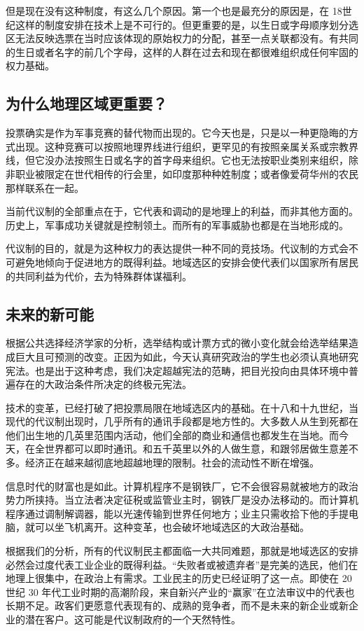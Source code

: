 但是现在没有这种制度，有这么几个原因。第一个也是最充分的原因是，在 18世纪这样的制度安排在技术上是不可行的。但更重要的是，以生日或字母顺序划分选区无法反映选票在当时应该体现的原始权力的分配，甚至一点关联都没有。有共同的生日或者名字的前几个字母，这样的人群在过去和现在都很难组织成任何牢固的权力基础。

\subsection{为什么地理区域更重要？}
投票确实是作为军事竞赛的替代物而出现的。它今天也是，只是以一种更隐晦的方式出现。这种竞赛可以按照地理界线进行组织，更罕见的有按照亲属关系或宗教界线，但它没办法按照生日或名字的首字母来组织。它也无法按职业类别来组织，除非职业被限定在世代相传的行会里，如印度那种种姓制度；或者像爱荷华州的农民那样联系在一起。

当前代议制的全部重点在于，它代表和调动的是地理上的利益，而非其他方面的。历史上，军事成功关键就是控制领土。而所有的军事威胁也都是在当地形成的。

代议制的目的，就是为这种权力的表达提供一种不同的竞技场。代议制的方式会不可避免地倾向于促进地方的既得利益。地域选区的安排会使代表们以国家所有居民的共同利益为代价，去为特殊群体谋福利。

\subsection{未来的新可能}
根据公共选择经济学家的分析，选举结构或计票方式的微小变化就会给选举结果造成巨大且可预测的改变。正因为如此，今天认真研究政治的学生也必须认真地研究宪法。也是出于这种考虑，我们决定超越宪法的范畴，把目光投向由具体环境中普遍存在的大政治条件所决定的终极元宪法。

技术的变革，已经打破了把投票局限在地域选区内的基础。在十八和十九世纪，当现代的代议制出现时，几乎所有的通讯手段都是地方性的。大多数人从生到死都在他们出生地的几英里范围内活动，他们全部的商业和通信也都发生在当地。而今天，在全世界都可以即时通讯。和五千英里以外的人做生意，和跟邻居做生意差不多。经济正在越来越彻底地超越地理的限制。社会的流动性不断在增强。

信息时代的财富也是如此。计算机程序不是钢铁厂，它不会很容易就被地方的政治势力所挟持。当立法者决定征税或监管业主时，钢铁厂是没办法移动的。而计算机程序通过调制解调器，能以光速传输到世界任何地方；业主只需收拾下他的手提电脑，就可以坐飞机离开。这种变革，也会破坏地域选区的大政治基础。

根据我们的分析，所有的代议制民主都面临一大共同难题，那就是地域选区的安排必然会过度代表工业企业的既得利益。“失败者或被遗弃者”是完美的选民，他们在地理上很集中，在政治上有需求。工业民主的历史已经证明了这一点。即使在 20 世纪 30 年代工业时期的高潮阶段，来自新兴产业的“赢家”在立法审议中的代表也长期不足。政客们更愿意代表现有的、成熟的竞争者，而不是未来的新企业或新企业的潜在客户。这可能是代议制政府的一个天然特性。

